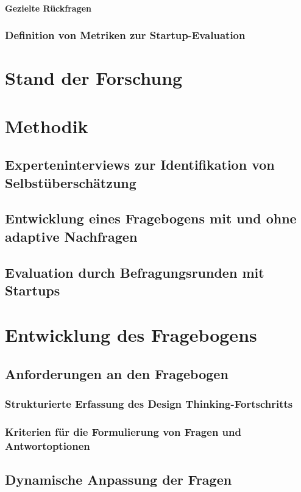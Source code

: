 \subsubsection{Gezielte Rückfragen}
\subsection{Definition von Metriken zur Startup-Evaluation}

\chapter{Stand der Forschung}

\chapter{Methodik}

\section{Experteninterviews zur Identifikation von Selbstüberschätzung}
\section{Entwicklung eines Fragebogens mit und ohne adaptive Nachfragen}
\section{Evaluation durch  Befragungsrunden mit Startups}

\chapter{Entwicklung des Fragebogens}

\section{Anforderungen an den Fragebogen}
\subsection{Strukturierte Erfassung des Design Thinking-Fortschritts}
\subsection{Kriterien für die Formulierung von Fragen und Antwortoptionen}

\section{Dynamische Anpassung der Fragen}
